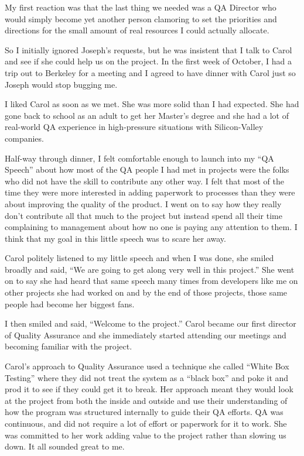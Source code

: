 \documentclass[12pt]{book}
\begin{document}
My first reaction was that the last thing we needed
was a QA Director who would simply become
yet another person clamoring to set the priorities
and directions for the small amount of real resources
I could actually allocate.

So I initially ignored Joseph's requests, but he
was insistent that I talk to Carol and see if she
could help us on the project. In the first week
of October, I had a trip out to Berkeley for a meeting
and I agreed to have dinner with Carol just so Joseph
would stop bugging me.

I liked Carol as soon as we met.  She was more solid
than I had expected.  She had gone back to school
as an adult to get her Master's degree and she had
a lot of real-world QA experience in high-pressure
situations with Silicon-Valley companies.

Half-way through dinner, I felt comfortable enough
to launch into my ``QA Speech'' about how most
of the QA people I had met in projects were the
folks who did not have the skill to contribute
any other way.  I felt that most of the time they
were more interested in adding paperwork to processes
than they were about improving the quality
of the product.  I went on to say how they really
don't contribute all that much to the project
but instead spend all their time complaining
to management about how no one is paying
any attention to them.  I think that my goal
in this little speech was to scare her away.

Carol politely listened to my little speech and when I
was done, she smiled broadly and said, ``We are going to
get along very well in this project.''  She
went on to say she had heard that same speech
many times from developers
like me on other projects she
had worked on and by the end of those projects,
those same people had become her biggest fans.

I then smiled and said, ``Welcome to the
project.'' Carol became our first director
of Quality Assurance and she immediately started
attending our meetings and becoming familiar
with the project.

\begin{sloppypar}
Carol's approach to Quality
Assurance used a technique she called ``White Box
Testing'' where they did not treat the system
as a ``black box'' and poke it and prod it
to see if they could get it to break.  Her
approach meant they would look at the
project from both the inside and outside and
use their understanding of how the program was
structured internally to guide their QA efforts.
QA was continuous, and did not require a lot
of effort or paperwork for it to work.
She was committed to her work adding value to
the project rather than slowing us down.
It all sounded great to me.
\end{sloppypar}
\end{document}
